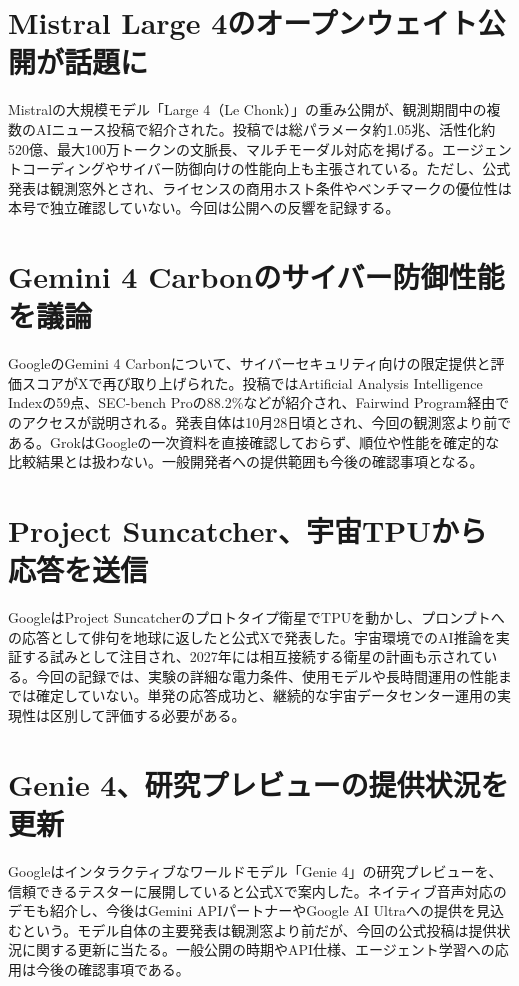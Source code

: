 \section{Mistral Large 4のオープンウェイト公開が話題に}
Mistralの大規模モデル「Large 4（Le Chonk）」の重み公開が、観測期間中の複数のAIニュース投稿で紹介された。投稿では総パラメータ約1.05兆、活性化約520億、最大100万トークンの文脈長、マルチモーダル対応を掲げる。エージェントコーディングやサイバー防御向けの性能向上も主張されている。ただし、公式発表は観測窓外とされ、ライセンスの商用ホスト条件やベンチマークの優位性は本号で独立確認していない。今回は公開への反響を記録する。

\section{Gemini 4 Carbonのサイバー防御性能を議論}
GoogleのGemini 4 Carbonについて、サイバーセキュリティ向けの限定提供と評価スコアがXで再び取り上げられた。投稿ではArtificial Analysis Intelligence Indexの59点、SEC-bench Proの88.2\%などが紹介され、Fairwind Program経由でのアクセスが説明される。発表自体は10月28日頃とされ、今回の観測窓より前である。GrokはGoogleの一次資料を直接確認しておらず、順位や性能を確定的な比較結果とは扱わない。一般開発者への提供範囲も今後の確認事項となる。

\section{Project Suncatcher、宇宙TPUから応答を送信}
GoogleはProject Suncatcherのプロトタイプ衛星でTPUを動かし、プロンプトへの応答として俳句を地球に返したと公式Xで発表した。宇宙環境でのAI推論を実証する試みとして注目され、2027年には相互接続する衛星の計画も示されている。今回の記録では、実験の詳細な電力条件、使用モデルや長時間運用の性能までは確定していない。単発の応答成功と、継続的な宇宙データセンター運用の実現性は区別して評価する必要がある。

\section{Genie 4、研究プレビューの提供状況を更新}
Googleはインタラクティブなワールドモデル「Genie 4」の研究プレビューを、信頼できるテスターに展開していると公式Xで案内した。ネイティブ音声対応のデモも紹介し、今後はGemini APIパートナーやGoogle AI Ultraへの提供を見込むという。モデル自体の主要発表は観測窓より前だが、今回の公式投稿は提供状況に関する更新に当たる。一般公開の時期やAPI仕様、エージェント学習への応用は今後の確認事項である。

